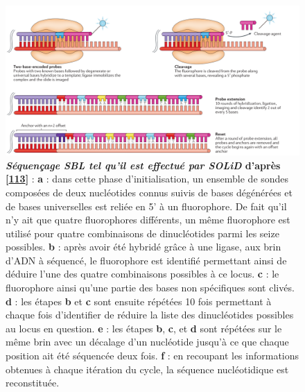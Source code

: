 \documentclass[12pt,a4paper,twoside]{ugathesis}
\theoremstyle{definition}
\theoremstyle{definition}
\theoremstyle{definition}
\theoremstyle{remark}
\begin{document}
\begin{figure}

{\centering \includegraphics[scale=.26]{figure/SBL_seq_solid} 

}

\caption[Séquençage SBL tel qu'il est effectué par SOLiD]{\textbf{\emph{Séquençage SBL tel qu'il est effectué par
SOLiD} d'après {[}\protect\hyperlink{ref-Goodwin2016}{113}{]}} :
\textbf{a} : dans cette phase d'initialisation, un ensemble de sondes
composées de deux nucléotides connus suivis de bases dégénérées et de
bases universelles est reliée en 5' à un fluorophore. De fait qu'il n'y
ait que quatre fluorophores différents, un même fluorophore est utilisé
pour quatre combinaisons de dinucléotides parmi les seize possibles.
\textbf{b} : après avoir été hybridé grâce à une ligase, aux brin d'ADN
à séquencé, le fluorophore est identifié permettant ainsi de déduire
l'une des quatre combinaisons possibles à ce locus. \textbf{c} : le
fluorophore ainsi qu'une partie des bases non spécifiques sont clivés.
\textbf{d} : les étapes \textbf{b} et \textbf{c} sont ensuite répétées
10 fois permettant à chaque fois d'identifier de réduire la liste des
dinucléotides possibles au locus en question. \textbf{e} : les étapes
\textbf{b}, \textbf{c}, et \textbf{d} sont répétées sur le même brin
avec un décalage d'un nucléotide jusqu'à ce que chaque position ait été
séquencée deux fois. \textbf{f} : en recoupant les informations obtenues
à chaque itération du cycle, la séquence nucléotidique est reconstituée.}\label{fig:pictsblSeq}
\end{figure}
\end{document}
